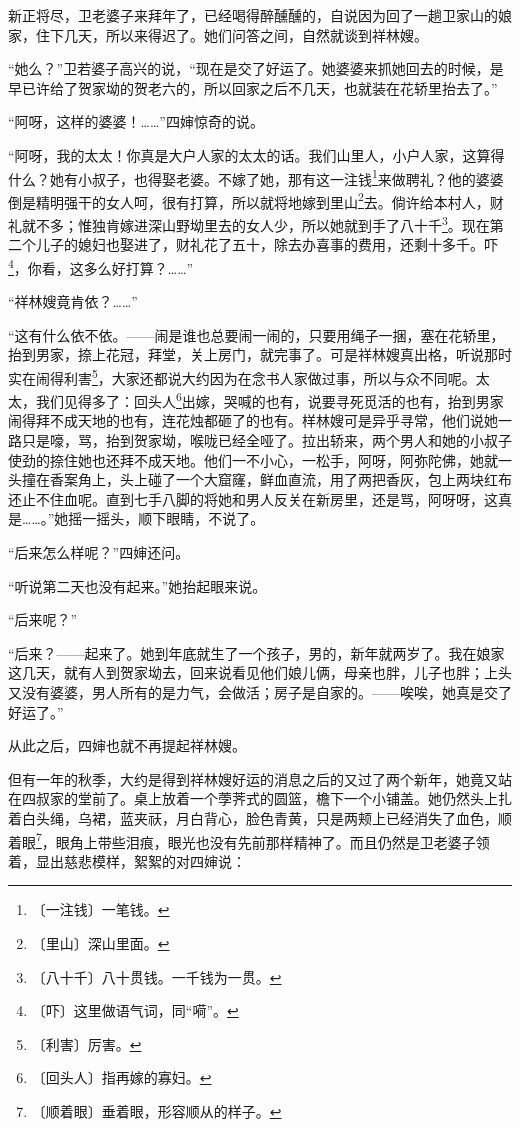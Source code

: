 \documentclass[12pt,UTF-8,openany]{ctexbook}
\begin{document}
\begin{large}
    新正将尽，卫老婆子来拜年了，已经喝得醉醺醺的，自说因为回了一趟卫家山的娘家，住下几天，所以来得迟了。她们问答之间，自然就谈到祥林嫂。
    
    “她么？”卫若婆子高兴的说，“现在是交了好运了。她婆婆来抓她回去的时候，是早已许给了贺家坳的贺老六的，所以回家之后不几天，也就装在花轿里抬去了。”
    
    “阿呀，这样的婆婆！……”四婶惊奇的说。
    
    “阿呀，我的太太！你真是大户人家的太太的话。我们山里人，小户人家，这算得什么？她有小叔子，也得娶老婆。不嫁了她，那有这一注钱\footnote{〔一注钱〕一笔钱。}来做聘礼？他的婆婆倒是精明强干的女人呵，很有打算，所以就将地嫁到里山\footnote{〔里山〕深山里面。}去。倘许给本村人，财礼就不多；惟独肯嫁进深山野坳里去的女人少，所以她就到手了八十千\footnote{〔八十千〕八十贯钱。一千钱为一贯。}。现在第二个儿子的媳妇也娶进了，财礼花了五十，除去办喜事的费用，还剩十多千。吓\footnote{〔吓〕这里做语气词，同“嗬”。}，你看，这多么好打算？……”
    
    “祥林嫂竟肯依？……”
    
    “这有什么依不依。——闹是谁也总要闹一闹的，只要用绳子一捆，塞在花轿里，抬到男家，捺上花冠，拜堂，关上房门，就完事了。可是祥林嫂真出格，听说那时实在闹得利害\footnote{〔利害〕厉害。}，大家还都说大约因为在念书人家做过事，所以与众不同呢。太太，我们见得多了：回头人\footnote{〔回头人〕指再嫁的寡妇。}出嫁，哭喊的也有，说要寻死觅活的也有，抬到男家闹得拜不成天地的也有，连花烛都砸了的也有。样林嫂可是异乎寻常，他们说她一路只是嚎，骂，抬到贺家坳，喉咙已经全哑了。拉出轿来，两个男人和她的小叔子使劲的捺住她也还拜不成天地。他们一不小心，一松手，阿呀，阿弥陀佛，她就一头撞在香案角上，头上碰了一个大窟窿，鲜血直流，用了两把香灰，包上两块红布还止不住血呢。直到七手八脚的将她和男人反关在新房里，还是骂，阿呀呀，这真是……。”她摇一摇头，顺下眼睛，不说了。
    
    “后来怎么样呢？”四婶还问。
    
    “听说第二天也没有起来。”她抬起眼来说。
    
    “后来呢？”
    
    “后来？——起来了。她到年底就生了一个孩子，男的，新年就两岁了。我在娘家这几天，就有人到贺家坳去，回来说看见他们娘儿俩，母亲也胖，儿子也胖；上头又没有婆婆，男人所有的是力气，会做活；房子是自家的。——唉唉，她真是交了好运了。”
    
    从此之后，四婶也就不再提起祥林嫂。
    
    但有一年的秋季，大约是得到祥林嫂好运的消息之后的又过了两个新年，她竟又站在四叔家的堂前了。桌上放着一个荸荠式的圆篮，檐下一个小铺盖。她仍然头上扎着白头绳，乌裙，蓝夹祆，月白背心，脸色青黄，只是两颊上已经消失了血色，顺着眼\footnote{〔顺着眼〕垂着眼，形容顺从的样子。}，眼角上带些泪痕，眼光也没有先前那样精神了。而且仍然是卫老婆子领着，显出慈悲模样，絮絮的对四婶说：
    

\end{large}
\end{document}
